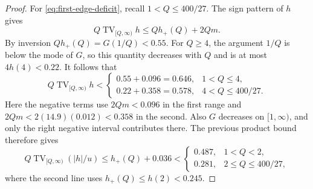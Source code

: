 \begin{proof}
For \eqref{eq:first-edge-deficit}, recall \(1<Q\le400/27\).
The sign pattern of \(h\) gives
\[
 Q\operatorname{TV}_{[Q,\infty)}h
 \le Qh_+(Q)+2Qm.
\]
By inversion \(Qh_+(Q)=G(1/Q)<0.55\). For \(Q\ge4\), the argument \(1/Q\) is below the mode of \(G\), so this quantity decreases with \(Q\) and is at most \(4h(4)<0.22\). It follows that
\begin{equation}\label{eq:first-signed-variation}
 Q\operatorname{TV}_{[Q,\infty)}h
 <\begin{cases}
 0.55+0.096=0.646,&1<Q\le4,\\
 0.22+0.358=0.578,&4<Q\le400/27.
 \end{cases}
\end{equation}
Here the negative terms use \(2Qm<0.096\) in the first range and
\(2Qm<2(14.9)(0.012)<0.358\) in the second. Also \(G\) decreases on
\([1,\infty)\), and only the right negative interval contributes there. The previous product bound therefore gives
\begin{equation}\label{eq:first-absolute-variation}
 Q\operatorname{TV}_{[Q,\infty)}(|h|/u)
 \le h_+(Q)+0.036
 <\begin{cases}
 0.487,&1<Q<2,\\
 0.281,&2\le Q\le400/27,
 \end{cases}
\end{equation}
where the second line uses \(h_+(Q)\le h(2)<0.245\).


\end{proof}
